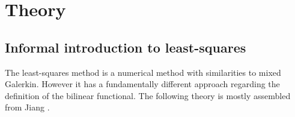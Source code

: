 
\chapter{Theory} %

\label{chap:theory} %



\section{Informal introduction to least-squares}
The least-squares method is a numerical method with similarities to mixed Galerkin. However it has a fundamentally different approach regarding the definition of the bilinear functional. The following theory is mostly assembled from Jiang \cite{Jiang}. 


